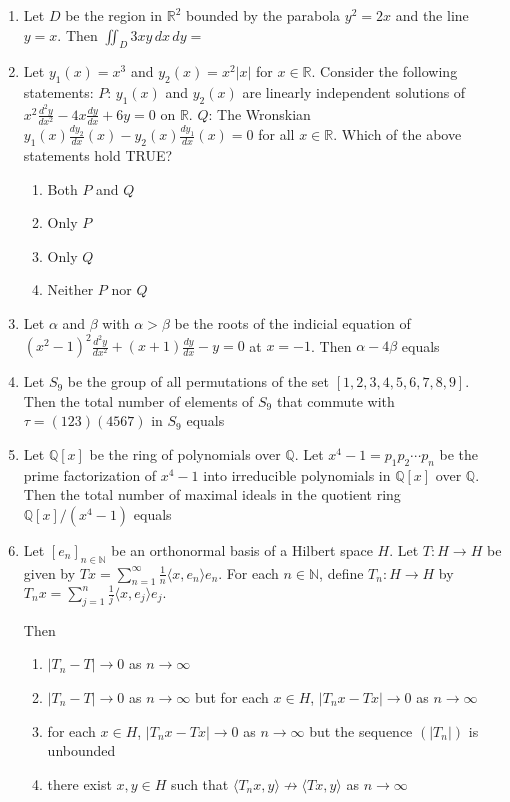 \documentclass{article}
\newcommand{\brak}[1]{\left( #1 \right)}
\newcommand{\sbrak}[1]{\left[ #1 \right]}
\newcommand{\abs}[1]{\left| #1 \right|}
\begin{document}
\begin{enumerate}
\item Let $D$ be the region in $\mathbb{R}^2$ bounded by the parabola $y^2 = 2 x$ and the line $y = x$. Then $\iint_D 3 x y \, dx \, dy =$

\item Let $y_1 \brak{x} = x^3$ and $y_2 \brak{x} = x^2 \abs{x}$ for $x \in \mathbb{R}$.
Consider the following statements:
$P$: $y_1 \brak{x}$ and $y_2 \brak{x}$ are linearly independent solutions of $x^2 \frac{d^2 y}{dx^2}  
 - 4 x \frac{dy}{dx} + 6 y = 0$ on $\mathbb{R}$.
$Q$: The Wronskian $y_1 \brak{x} \frac{dy_2}{dx} \brak{x} - y_2 \brak{x} \frac{dy_1}{dx} \brak{x} = 0$ for all $x \in \mathbb{R}$.  
Which of the above statements hold TRUE?

\begin{enumerate}
    \item Both $P$ and $Q$
    \item Only $P$
    \item Only $Q$
    \item Neither $P$ nor $Q$
\end{enumerate}

\item Let $\alpha$ and $\beta$ with $\alpha > \beta$ be the roots of the indicial equation of $\brak{x^2 - 1}^2 \frac{d^2 y}{dx^2} + \brak{x + 1} \frac{dy}{dx} - y = 0$ at $x = -1$. Then $\alpha - 4 \beta$ equals

\item Let $S_9$ be the group of all permutations of the set $\sbrak{1, 2, 3, 4, 5, 6, 7, 8, 9}$. Then the total number of elements of $S_9$ that commute with $\tau = \brak{123} \brak{4567}$ in $S_9$ equals

\item Let $\mathbb{Q} \sbrak{x}$ be the ring of polynomials over $\mathbb{Q}$. Let $x^4 - 1 = p_1 p_2 \cdots p_n$ be the prime factorization of $x^4 - 1$ into irreducible polynomials in $\mathbb{Q} \sbrak{x}$ over $\mathbb{Q}$. Then the total number of maximal ideals in the quotient ring $\mathbb{Q} \sbrak{x} / \brak{x^4 - 1}$ equals

\item Let $\sbrak{e_n}_{n \in \mathbb{N}}$ be an orthonormal basis of a Hilbert space $H$. Let $T: H \to H$ be given by 
$T x = \sum_{n=1}^{\infty} \frac{1}{n} \langle x, e_n \rangle e_n.$
For each $n \in \mathbb{N}$, define $T_n: H \to H$ by 
$T_n x = \sum_{j=1}^{n} \frac{1}{j} \langle x, e_j \rangle e_j.$

Then

\begin{enumerate}
    \item $\abs{T_n - T} \to 0$ as $n \to \infty$
    \item $\abs{T_n - T} \to 0$ as $n \to \infty$ but for each $x \in H$, $\abs{T_n x - T x} \to 0$ as $n \to \infty$
    \item for each $x \in H$, $\abs{T_n x - T x} \to 0$ as $n \to \infty$ but the sequence $\brak{\abs{T_n}}$ is unbounded
    \item there exist $x, y \in H$ such that $\langle T_n x, y \rangle \nrightarrow \langle T x, y \rangle$ as $n \to \infty$
\end{enumerate}

\end{enumerate}
\end{document}
